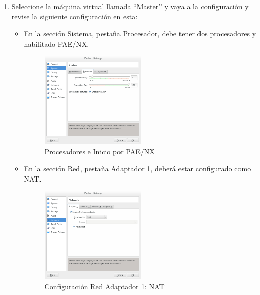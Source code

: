 \begin{enumerate}
\item Seleccione la máquina virtual llamada ``Master'' y vaya a la configuración y revise la siguiente configuración en esta:

\begin{itemize}

	\item En la sección Sistema, pestaña Procesador, debe tener dos procesadores y habilitado PAE/NX.

	
	
	
	\begin{figure}[H]
		\centering
		\includegraphics[width=0.5\textwidth]{aux/procesadores}
		\caption{Procesadores e Inicio por PAE/NX}
	\end{figure}
	
	

	\item En la sección Red, pestaña Adaptador 1, deberá estar configurado como NAT. 


	
	\begin{figure}[H]
		\centering
		\includegraphics[width=0.5\textwidth]{aux/rednat}
		\caption{Configuración Red Adaptador 1: NAT}
	\end{figure}
	

\end{itemize}
\end{enumerate}
